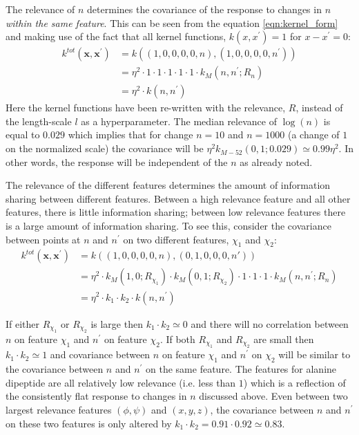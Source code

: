 The relevance of $n$ determines the covariance of the response to changes in $n$ \emph{within the same feature}. This can be seen from the equation \ref{eqn:kernel_form} and making use of the fact that all kernel functions, $k(x, x^{\prime})=1$ for $x-x^{\prime}=0$:
\begin{equation*}
\begin{split}
    k^{tot}(\mathbf{x}, \mathbf{x}^{\prime})& = k\left((1, 0, 0, 0, 0, n), (1, 0, 0, 0, 0, n^{\prime})\right) \\
    & = \eta^{2}\cdot 1 \cdot 1\cdot 1 \cdot 1\cdot 1 \cdot k_{M}(n, n^{\prime}; R_{n}) \\
    & = \eta^{2}\cdot k(n, n^{\prime})
\end{split}
\end{equation*}
Here the kernel functions have been re-written with the relevance, $R$, instead of the length-scale $l$ as a hyperparameter. The median relevance of $\log{(n)}$ is equal to $\num{0.029}$ which implies that for change $n=10$ and $n=1000$ (a change of $1$ on the normalized scale) the covariance will be $\eta^{2}k_{M-52}(0,1; 0.029) \simeq 0.99\eta^{2}$. In other words, the response will be independent of the $n$ as already noted. 

The relevance of the different features determines the amount of information sharing between different features.\cite{duvenaud2011additive} Between a high relevance feature and all other features, there is little information sharing; between low relevance features there is a large amount of information sharing. To see this, consider the covariance between points at $n$ and $n^{\prime}$ on two different features, $\chi_1$ and $\chi_2$: 
\begin{equation*}
\begin{split}
    k^{tot}(\mathbf{x}, \mathbf{x}^{\prime})& = k\left((1, 0, 0, 0, 0, n), (0, 1, 0, 0, 0, n')\right) \\
    & = \eta^{2}\cdot k_{M}\left(1, 0; R_{\chi_1}\right) \cdot k_{M}\left(0, 1; R_{\chi_2}\right) \cdot 1 \cdot 1\cdot 1 \cdot k_{M}(n, n^{\prime}; R_{n}) \\
    &=  \eta^{2}\cdot k_{1}\cdot k_{2}\cdot k(n, n^{\prime})
\end{split}
\end{equation*}

If either $R_{\chi_1}$ or $R_{\chi_2}$ is large then $k_1 \cdot k_2 \simeq 0$ and there will no correlation between $n$ on feature $\chi_1$ and $n^{\prime}$ on feature $\chi_2$. If both $R_{\chi_1}$ and $R_{\chi_2}$ are small then $k_1 \cdot k_2 \simeq 1$ and covariance between $n$ on feature $\chi_1$ and $n^{\prime}$ on $\chi_2$ will be similar to the covariance between $n$ and $n^{\prime}$ on the same feature.  The features for alanine dipeptide are all relatively low relevance (i.e. less than $1$) which is a reflection of the  consistently flat response to changes in $n$ discussed above. Even between  two largest relevance features $(\phi, \psi)$ and $(x,y,z)$, the covariance between $n$ and $n^{\prime}$ on these two features is only altered by  $k_{1}\cdot k_{2} = 0.91\cdot0.92 \simeq 0.83$. 


